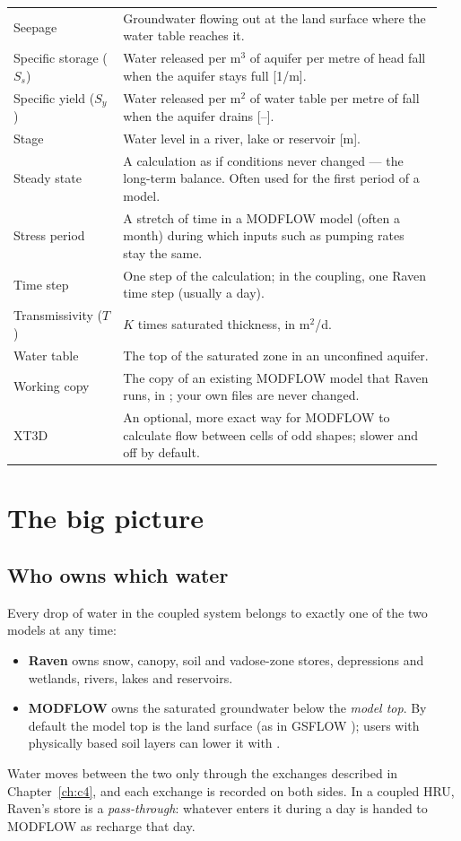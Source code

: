 \begin{longtable}{P{0.24\linewidth}P{0.708\linewidth}}
Seepage & Groundwater flowing out at the land surface where the water table reaches it.\\
Specific storage ($S_s$) & Water released per m$^3$ of aquifer per metre of head fall when the aquifer stays full [1/m].\\
Specific yield ($S_y$) & Water released per m$^2$ of water table per metre of fall when the aquifer drains [--].\\
Stage & Water level in a river, lake or reservoir [m].\\
Steady state & A calculation as if conditions never changed --- the long-term balance. Often used for the first period of a model.\\
Stress period & A stretch of time in a MODFLOW model (often a month) during which inputs such as pumping rates stay the same.\\
Time step & One step of the calculation; in the coupling, one Raven time step (usually a day).\\
Transmissivity ($T$) & $K$ times saturated thickness, in m$^2$/d.\\
Water table & The top of the saturated zone in an unconfined aquifer.\\
Working copy & The copy of an existing MODFLOW model that Raven runs, in ; your own files are never changed.\\
XT3D & An optional, more exact way for MODFLOW to calculate flow between cells of odd shapes; slower and off by default.\\\bottomrule
\end{longtable}

\section{The big picture}\label{ch:overview}
\subsection{Who owns which water}
Every drop of water in the coupled system belongs to exactly one of the two models at any time:
\begin{itemize}
\item \textbf{Raven} owns snow, canopy, soil and vadose-zone stores, depressions and wetlands, rivers, lakes and
reservoirs.
\item \textbf{MODFLOW} owns the saturated groundwater below the \emph{model top}. By default the model top is the land
surface (as in GSFLOW \cite{markstrom2008gsflow}); users with physically based soil layers can lower it with
.
\end{itemize}
Water moves between the two only through the exchanges described in Chapter~\ref{ch:c4}, and each exchange is recorded on both
sides. In a coupled HRU, Raven's  store is a \emph{pass-through}: whatever enters it during a day is
handed to MODFLOW as recharge that day.


